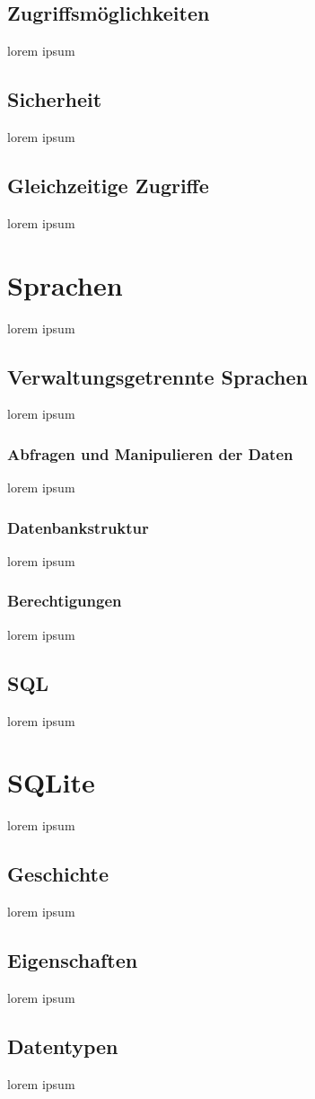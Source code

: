 \documentclass[12pt,a4paper]{report}
\begin{document}
\subsection{Zugriffsmöglichkeiten}
lorem ipsum
\subsection{Sicherheit}
lorem ipsum
\subsection{Gleichzeitige Zugriffe}
lorem ipsum 
\section{Sprachen}
lorem ipsum
\subsection{Verwaltungsgetrennte Sprachen}
lorem ipsum
\subsubsection{Abfragen und Manipulieren der Daten}
lorem ipsum
\subsubsection{Datenbankstruktur}
lorem ipsum
\subsubsection{Berechtigungen}
lorem ipsum
\subsection{SQL}
lorem ipsum
\section{SQLite}
lorem ipsum
\subsection{Geschichte}
lorem ipsum
\subsection{Eigenschaften}
lorem ipsum
\subsection{Datentypen}
lorem ipsum
\end{document}
